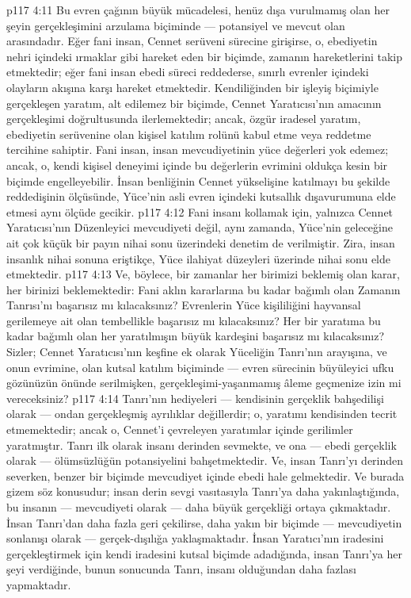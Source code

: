 \vs p117 4:11 Bu evren çağının büyük mücadelesi, henüz dışa vurulmamış olan her şeyin gerçekleşimini arzulama biçiminde --- potansiyel ve mevcut olan arasındadır. Eğer fani insan, Cennet serüveni sürecine girişirse, o, ebediyetin nehri içindeki ırmaklar gibi hareket eden bir biçimde, zamanın hareketlerini takip etmektedir; eğer fani insan ebedi süreci reddederse, sınırlı evrenler içindeki olayların akışına karşı hareket etmektedir. Kendiliğinden bir işleyiş biçimiyle gerçekleşen yaratım, alt edilemez bir biçimde, Cennet Yaratıcısı’nın amacının gerçekleşimi doğrultusunda ilerlemektedir; ancak, özgür iradesel yaratım, ebediyetin serüvenine olan kişisel katılım rolünü kabul etme veya reddetme tercihine sahiptir. Fani insan, insan mevcudiyetinin yüce değerleri yok edemez; ancak, o, kendi kişisel deneyimi içinde bu değerlerin evrimini oldukça kesin bir biçimde engelleyebilir. İnsan benliğinin Cennet yükselişine katılmayı bu şekilde reddedişinin ölçüsünde, Yüce’nin asli evren içindeki kutsallık dışavurumuna elde etmesi aynı ölçüde gecikir.
\vs p117 4:12 Fani insanı kollamak için, yalnızca Cennet Yaratıcısı’nın Düzenleyici mevcudiyeti değil, aynı zamanda, Yüce’nin geleceğine ait çok küçük bir payın nihai sonu üzerindeki denetim de verilmiştir. Zira, insan insanlık nihai sonuna eriştikçe, Yüce ilahiyat düzeyleri üzerinde nihai sonu elde etmektedir.
\vs p117 4:13 Ve, böylece, bir zamanlar her birimizi beklemiş olan karar, her birinizi beklemektedir: Fani aklın kararlarına bu kadar bağımlı olan Zamanın Tanrısı’nı başarısız mı kılacaksınız? Evrenlerin Yüce kişililiğini hayvansal gerilemeye ait olan tembellikle başarısız mı kılacaksınız? Her bir yaratıma bu kadar bağımlı olan her yaratılmışın büyük kardeşini başarısız mı kılacaksınız? Sizler; Cennet Yaratıcısı’nın keşfine ek olarak Yüceliğin Tanrı’nın arayışına, ve onun evrimine, olan kutsal katılım biçiminde --- evren sürecinin büyüleyici ufku gözünüzün önünde serilmişken, gerçekleşimi\hyp{}yaşanmamış âleme geçmenize izin mi vereceksiniz?
\vs p117 4:14 Tanrı’nın hediyeleri --- kendisinin gerçeklik bahşedilişi olarak --- ondan gerçekleşmiş ayrılıklar değillerdir; o, yaratımı kendisinden tecrit etmemektedir; ancak o, Cennet’i çevreleyen yaratımlar içinde gerilimler yaratmıştır. Tanrı ilk olarak insanı derinden sevmekte, ve ona --- ebedi gerçeklik olarak --- ölümsüzlüğün potansiyelini bahşetmektedir. Ve, insan Tanrı’yı derinden severken, benzer bir biçimde mevcudiyet içinde ebedi hale gelmektedir. Ve burada gizem söz konusudur; insan derin sevgi vasıtasıyla Tanrı’ya daha yakınlaştığında, bu insanın --- mevcudiyeti olarak --- daha büyük gerçekliği ortaya çıkmaktadır. İnsan Tanrı’dan daha fazla geri çekilirse, daha yakın bir biçimde --- mevcudiyetin sonlanışı olarak --- gerçek\hyp{}dışılığa yaklaşmaktadır. İnsan Yaratıcı’nın iradesini gerçekleştirmek için kendi iradesini kutsal biçimde adadığında, insan Tanrı’ya her şeyi verdiğinde, bunun sonucunda Tanrı, insanı olduğundan daha fazlası yapmaktadır.
